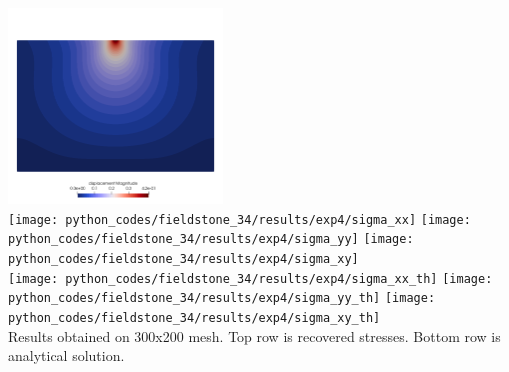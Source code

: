 \begin{center}
\includegraphics[width=5.7cm]{python_codes/fieldstone_34/results/exp4/disp}\\
\texttt{[image: python\_codes/fieldstone\_34/results/exp4/sigma\_xx]}
\texttt{[image: python\_codes/fieldstone\_34/results/exp4/sigma\_yy]}
\texttt{[image: python\_codes/fieldstone\_34/results/exp4/sigma\_xy]}\\
\texttt{[image: python\_codes/fieldstone\_34/results/exp4/sigma\_xx\_th]}
\texttt{[image: python\_codes/fieldstone\_34/results/exp4/sigma\_yy\_th]}
\texttt{[image: python\_codes/fieldstone\_34/results/exp4/sigma\_xy\_th]}\\
{\captionfont Results obtained on 300x200 mesh. Top row is recovered stresses. 
Bottom row is analytical solution.}
\end{center}

